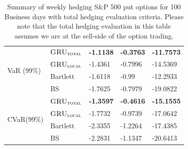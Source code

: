 \documentclass[letterpaper,12pt,titlepage,oneside,final]{book}
\numberwithin{equation}{section}
\theoremstyle{definition}
\newcommand{\modelT}{\textsc{GRU}_{\textsc{total}}}
\newcommand{\modelL}{\textsc{GRU}_{\textsc{local}}}
\begin{document}
\begin{table}[htp!]
\begin{tabular}{ll|l|l|l|}
		\hline
		\multicolumn{1}{|l|}{\multirow{4}{*}{VaR (99\%)}}     & $\modelT$    & \textbf{-1.1138} & \textbf{-0.3763} & \textbf{-11.7573} \\  
		\multicolumn{1}{|l|}{}                                & $\modelL$    & -1.4361          & -0.7996          & -14.5369           \\ 
		\multicolumn{1}{|l|}{}                                & Bartlett 	 & -1.6118  		 &-0.99   		   &-12.2933         \\  
		\multicolumn{1}{|l|}{}                                & BS       	 & -1.7625  		&-0.7979 		   &-19.0822          \\ 
		\hline
		\multicolumn{1}{|l|}{\multirow{4}{*}{CVaR(99\%)}}     & $\modelT$    & \textbf{-1.3597} & \textbf{-0.4616} & \textbf{-15.1555} \\  
		\multicolumn{1}{|l|}{}                                & $\modelL$    & -1.7732          & -0.9739          & -17.0642         \\ 
		\multicolumn{1}{|l|}{}                                & Bartlett     &-2.3355  			&-1.2264 		   &-17.4385          \\ 
		\multicolumn{1}{|l|}{}                                & BS       	 & -2.2831  		&-1.1347 		   &-20.6413          \\ \hline
	\end{tabular}
	\caption{Summary of weekly hedging S\&P 500 put options for 100 Business days with total hedging evaluation criteria. Please note that the total hedging evaluation in this table assumes we are at the sell-side of the option trading.} \label{table:putTotalW}
\end{table}
\end{document}
